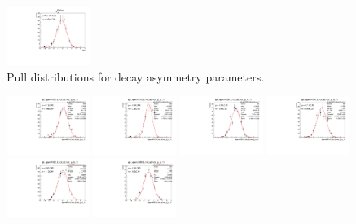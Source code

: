 \begin{figure}[h]
    \includegraphics[width=0.24\textwidth]{figure/io_full_sim/alpha/pull_alpha_lambda_K_892_0.pdf}
    \caption{Pull distributions for decay asymmetry parameters.}
\label{fig:io_wo_bkg_pull_asymmetry}
\end{figure}

\begin{figure}[h]\centering
    \includegraphics[width=0.24\textwidth]{figure/io_wo_bkg/gls/pull_gls_epem4600_Lmdc.aLmdc_g_ls_1r.pdf}
    \includegraphics[width=0.24\textwidth]{figure/io_wo_bkg/gls/pull_gls_epem4612_Lmdc.aLmdc_g_ls_1r.pdf}
    \includegraphics[width=0.24\textwidth]{figure/io_wo_bkg/gls/pull_gls_epem4626_Lmdc.aLmdc_g_ls_1r.pdf}
    \includegraphics[width=0.24\textwidth]{figure/io_wo_bkg/gls/pull_gls_epem4640_Lmdc.aLmdc_g_ls_1r.pdf}
    \includegraphics[width=0.24\textwidth]{figure/io_wo_bkg/gls/pull_gls_epem4660_Lmdc.aLmdc_g_ls_1r.pdf}
    \includegraphics[width=0.24\textwidth]{figure/io_wo_bkg/gls/pull_gls_epem4680_Lmdc.aLmdc_g_ls_1r.pdf}

\end{figure}
